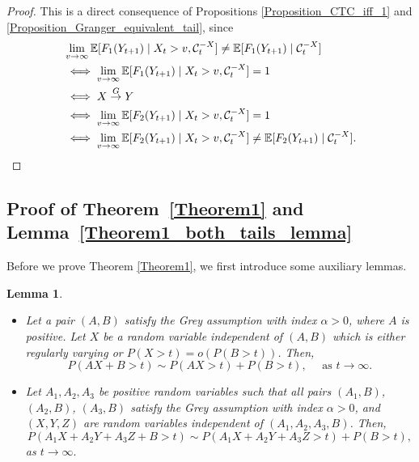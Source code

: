 \documentclass[a4paper,11pt]{article}
\newtheorem{lemma}{Lemma}
\newcommand{\toverset}[2]{\overset{{\rm #1}}{#2}}
\begin{document}
\begin{proof}\label{proof_of_lemma_o_invariance_about_F}
This is a direct consequence of Propositions \ref{Proposition_CTC_iff_1} and \ref{Proposition_Granger_equivalent_tail}, since  
\begin{equation*}
    \begin{split}
      &  \lim_{v\to\infty} \mathbb{E}[ F_1(Y_{t+1})\mid X_t>v,\mathcal{C}^{-\textbf{X}}_t]\neq\mathbb{E}[ F_1(Y_{t+1})\mid  \mathcal{C}^{-\textbf{X}}_t]\\&\iff \lim_{v\to\infty} \mathbb{E}[ F_1(Y_{t+1})\mid X_t>v,\mathcal{C}^{-\textbf{X}}_t]=1\\&
      \iff X\toverset{G}{\to}Y\\&
      \iff \lim_{v\to\infty} \mathbb{E}[ F_2(Y_{t+1})\mid X_t>v,\mathcal{C}^{-\textbf{X}}_t]=1
      \\&\iff  \lim_{v\to\infty} \mathbb{E}[ F_2(Y_{t+1})\mid X_t>v,\mathcal{C}^{-\textbf{X}}_t]\neq\mathbb{E}[ F_2(Y_{t+1})\mid  \mathcal{C}^{-\textbf{X}}_t].
    \end{split}
\end{equation*}
\end{proof}

\newpage
\subsection{Proof of Theorem~\ref{Theorem1} and Lemma~\ref{Theorem1_both_tails_lemma}}
\label{proof_of_thm1}
Before we prove Theorem \ref{Theorem1}, we first introduce some auxiliary lemmas. 

\begin{lemma}\label{PropositionLemma}
 \begin{itemize}
     \item Let a pair $(A,B)$ satisfy the Grey assumption with index $\alpha>0$, where $A$ is positive. Let $X$ be a random variable independent of $(A,B)$ which is either regularly varying or $P(X>t) = o(P(B>t))$. Then,$$P(AX+B>t)\sim P(AX>t)+P(B>t), \quad \text{ as }t\to\infty.  $$
     \item Let $A_1, A_2, A_3$ be positive random variables such that all pairs $(A_1, B)$, $(A_2, B)$, $(A_3,B)$ satisfy the Grey assumption with index $\alpha>0$, and $(X,Y,Z)$ are random variables independent of $(A_1, A_2, A_3,B)$. Then,
 $$P(A_1X+A_2Y+A_3Z+ B>t)\sim P(A_1X+A_2Y+A_3Z>t)+P(B>t),$$
as $t\to\infty. $\end{itemize}
\end{lemma}
\end{document}
